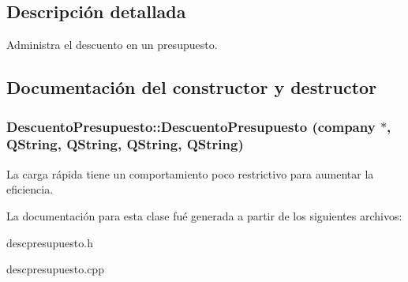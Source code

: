 \subsection{Descripci\'{o}n detallada}
Administra el descuento en un presupuesto. 



\subsection{Documentaci\'{o}n del constructor y destructor}
\subsubsection{\setlength{\rightskip}{0pt plus 5cm}Descuento\-Presupuesto::Descuento\-Presupuesto ({\bf company} $\ast$, QString, QString, QString, QString)}\label{classDescuentoPresupuesto_a1}


La carga r\'{a}pida tiene un comportamiento poco restrictivo para aumentar la eficiencia. 

La documentaci\'{o}n para esta clase fu\'{e} generada a partir de los siguientes archivos:\begin{CompactItemize}
\item 
descpresupuesto.h\item 
descpresupuesto.cpp\end{CompactItemize}
